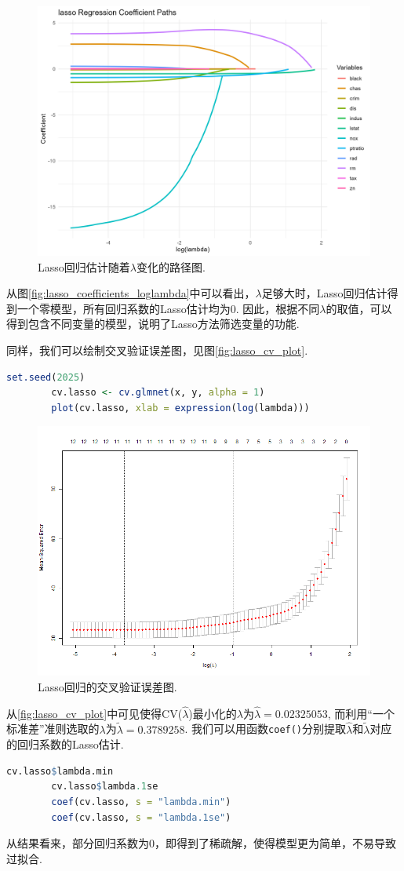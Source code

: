 \documentclass[12pt, a4paper, oneside]{ctexart}
\begin{document}
	\begin{figure}[H]
		\small
		\centering
		\includegraphics[width=0.8\columnwidth]{../Figure/lasso_coefficients_loglambda.png}
		\caption{Lasso回归估计随着$\lambda$变化的路径图.}
		\label{fig:lasso_coefficients_loglambda}
	\end{figure}
	
	从图\eqref{fig:lasso_coefficients_loglambda}中可以看出，$\lambda$足够大时，Lasso回归估计得到一个零模型，所有回归系数的Lasso估计均为$0$. 因此，根据不同$\lambda$的取值，可以得到包含不同变量的模型，说明了Lasso方法筛选变量的功能.			
	
	同样，我们可以绘制交叉验证误差图，见图\eqref{fig:lasso_cv_plot}.
	\begin{lstlisting}[language=R]
		set.seed(2025)
		cv.lasso <- cv.glmnet(x, y, alpha = 1)
		plot(cv.lasso, xlab = expression(log(lambda)))
	\end{lstlisting}
	\begin{figure}[H]
		\small
		\centering
		\includegraphics[width=0.8\columnwidth]{../Figure/lasso_cv_plot.png}
		\caption{Lasso回归的交叉验证误差图.}
		\label{fig:lasso_cv_plot}
	\end{figure}
	从\eqref{fig:lasso_cv_plot}中可见使得CV($\hat{\lambda}$)最小化的$\lambda$为$\hat{\lambda} = 0.02325053$, 而利用“一个标准差”准则选取的$\lambda$为$\tilde{\lambda} = 0.3789258$. 我们可以用函数\texttt{coef()}分别提取$\hat{\lambda}$和$\tilde{\lambda}$对应的回归系数的Lasso估计.
	\begin{lstlisting}[language=R]
		cv.lasso$lambda.min
		cv.lasso$lambda.1se
		coef(cv.lasso, s = "lambda.min")
		coef(cv.lasso, s = "lambda.1se")
	\end{lstlisting}
	从结果看来，部分回归系数为0，即得到了稀疏解，使得模型更为简单，不易导致过拟合.
	
\end{document}
